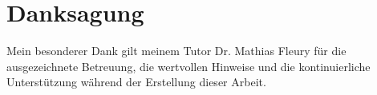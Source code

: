 \section*{Danksagung}

Mein besonderer Dank gilt meinem Tutor Dr. Mathias Fleury für die ausgezeichnete Betreuung, die 
wertvollen Hinweise und die kontinuierliche Unterstützung während der Erstellung dieser Arbeit.

